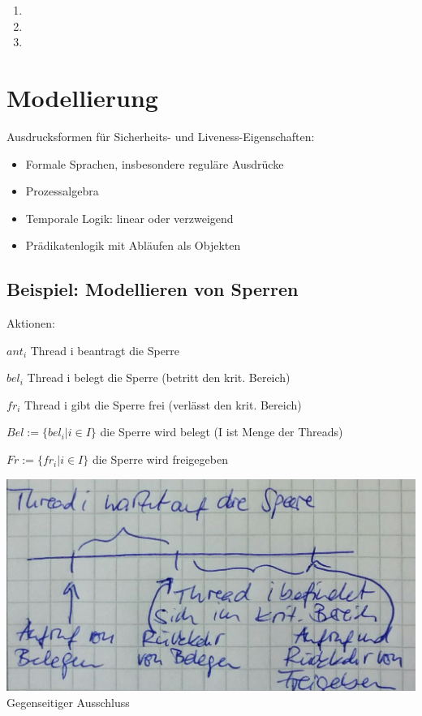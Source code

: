 \begin{enumerate}
\item
\item
\item
\end{enumerate}

\section{Modellierung}
Ausdrucksformen für Sicherheits- und Liveness-Eigenschaften:
\begin{itemize}
\item Formale Sprachen, insbesondere reguläre Ausdrücke
\item Prozessalgebra
\item Temporale Logik: linear oder verzweigend
\item Prädikatenlogik mit Abläufen als Objekten
\end{itemize}

\subsection*{Beispiel: Modellieren von Sperren}
Aktionen:
\begin{description}
	\item {$ant_i$} Thread i beantragt die Sperre
	\item {$bel_i$} Thread i belegt die Sperre (betritt den krit. Bereich)
	\item {$fr_i$} Thread i gibt die Sperre frei (verlässt den krit. Bereich)
	\item {$Bel:=\{bel_i | i \in I\}$} die Sperre wird belegt (I ist Menge der Threads)
	\item {$Fr:=\{fr_i | i \in I\}$} die Sperre wird freigegeben
\end{description}
\includegraphics[width=.4\textwidth]{Verifikation_Zeitstrahl4.jpeg}\\
Gegenseitiger Ausschluss
